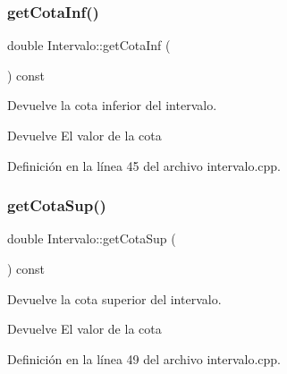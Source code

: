 \subsubsection{\texorpdfstring{getCotaInf()}{getCotaInf()}}
{\footnotesize\ttfamily double Intervalo\+::get\+Cota\+Inf (\begin{DoxyParamCaption}{ }\end{DoxyParamCaption}) const}



Devuelve la cota inferior del intervalo. 

\begin{DoxyReturn}{Devuelve}
El valor de la cota 
\end{DoxyReturn}


Definición en la línea 45 del archivo intervalo.\+cpp.


\begin{DoxyCode}{0}

\end{DoxyCode}
\mbox{\label{classIntervalo_a2dd767a860e4e85ec3d5a44e78884b76}} 
\subsubsection{\texorpdfstring{getCotaSup()}{getCotaSup()}}
{\footnotesize\ttfamily double Intervalo\+::get\+Cota\+Sup (\begin{DoxyParamCaption}{ }\end{DoxyParamCaption}) const}



Devuelve la cota superior del intervalo. 

\begin{DoxyReturn}{Devuelve}
El valor de la cota 
\end{DoxyReturn}


Definición en la línea 49 del archivo intervalo.\+cpp.


\begin{DoxyCode}{0}

\end{DoxyCode}
\mbox{\label{classIntervalo_a3e7cfa7c148a4e60be7040fecf506313}} 
